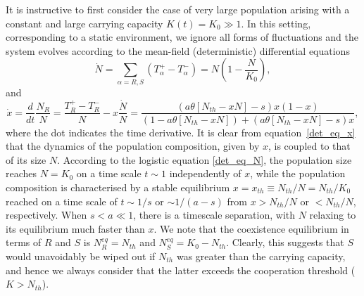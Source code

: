\documentclass{article}
\begin{document}
It is instructive to first consider the case of very large population arising with a constant and large carrying capacity \(K(t)=K_0\gg 1\). In this setting, corresponding to a static environment, we ignore  all forms of fluctuations and  the system evolves according to the mean-field (deterministic) differential equations 
\begin{equation}
    \dot{N}=\sum_{\alpha=R,S}\left(T^+_{\alpha}-T^-_{\alpha}\right)=N\left(1-\frac{N}{K_0}\right), \label{det_eq_N}
\end{equation}
and
\begin{equation}
    \dot{x}=\frac{d}{dt}\frac{N_R}{N}=\frac{T^+_{R}-T^-_{R}}{N}-x\frac{\dot{N}}{N}=\frac{\left(a\theta\left[N_{th}-xN\right]-s\right)x(1-x)}{\left(1-a\theta\left[N_{th}-xN\right]\right)+\left(a\theta\left[N_{th}-xN\right]-s\right)x},
    \label{det_eq_x}
\end{equation}
where the dot indicates the time derivative. It is clear from equation~\eqref{det_eq_x} that the dynamics of the population composition, given by $x$, is coupled to that of its size $N$. According to the logistic equation \eqref{det_eq_N}, the population size reaches $N=K_0$ on a time scale $t\sim 1$ independently of $x$, while the population composition is characterised by a stable equilibrium $x=x_{th}\equiv N_{th}/N=N_{th}/K_0$ reached on a time scale of \(t\sim 1/s\) or \(\sim 1/(a-s)\) from \(x>N_{th}/N\) or \(<N_{th}/N\), respectively. When $s<a\ll1$, there is a timescale separation, with $N$ relaxing to its equilibrium much faster than $x$. We note that the coexistence equilibrium in terms of \(R\) and \(S\) is \(N_{R}^{eq}=N_{th}\) and \(N_{S}^{eq}=K_0-N_{th}\). Clearly, this suggests that $S$ would unavoidably be wiped out if $N_{th}$ was greater than the carrying capacity, and hence we always consider that the latter exceeds the cooperation threshold ($K>N_{th}$).
\end{document}
